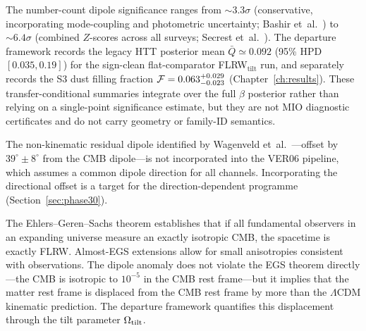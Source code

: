The number-count dipole significance ranges from
$\sim\!3.3\sigma$ (conservative, incorporating mode-coupling
and photometric uncertainty;
Bashir et~al.~\cite{Bashir2025}) to $\sim\!6.4\sigma$
(combined $Z$-scores across all surveys;
Secrest et~al.~\cite{SecrestRMP2025}).  The departure
framework records the legacy HTT posterior mean
$\bar{Q}\simeq 0.092$ (95\% HPD $[0.035,0.19]$) for the
sign-clean flat-comparator FLRW$_{\mathrm{tilt}}$ run, and
separately records the S3 dust filling fraction
$\mathcal{F}=0.063^{+0.029}_{-0.023}$ (Chapter~\ref{ch:results}).
These transfer-conditional summaries integrate over the full
$\beta$ posterior rather than relying on a single-point
significance estimate, but they are not MIO diagnostic
certificates and do not carry geometry or family-ID semantics.

The non-kinematic residual dipole identified by Wagenveld
et~al.~\cite{Wagenveld2025}---offset by $39^\circ \pm 8^\circ$
from the CMB dipole---is not incorporated into the VER06
pipeline, which assumes a common dipole direction for all
channels.  Incorporating the directional offset is a target
for the direction-dependent programme
(Section~\ref{sec:phase30}).

\begin{remark}
\label{rem:EGS}
The Ehlers--Geren--Sachs theorem establishes that if all
fundamental observers in an expanding universe measure an
exactly isotropic CMB, the spacetime is exactly FLRW.
Almost-EGS extensions allow for small anisotropies
consistent with observations.  The dipole anomaly does
not violate the EGS theorem directly---the CMB is
isotropic to $10^{-5}$ in the CMB rest frame---but it
implies that the matter rest frame is displaced from the
CMB rest frame by more than the $\Lambda$CDM kinematic
prediction.  The departure framework quantifies this
displacement through the tilt parameter $\Omega_{\mathrm{tilt}}$.
\end{remark}
